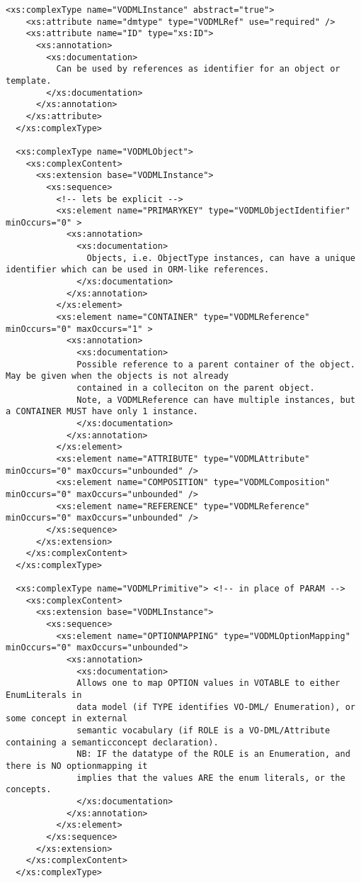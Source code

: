 \documentclass[11pt,a4paper]{ivoa}
\begin{document}
\begin{lstlisting}[label=lst:mapping,caption=VOTable schema extension for VO-DML mapping,frame=tb]
  <xs:complexType name="VODMLInstance" abstract="true">
    <xs:attribute name="dmtype" type="VODMLRef" use="required" />
    <xs:attribute name="ID" type="xs:ID">
      <xs:annotation>
        <xs:documentation>
          Can be used by references as identifier for an object or template.
        </xs:documentation>
      </xs:annotation>
    </xs:attribute>
  </xs:complexType>

  <xs:complexType name="VODMLObject">
    <xs:complexContent>
      <xs:extension base="VODMLInstance">
        <xs:sequence>
          <!-- lets be explicit -->
          <xs:element name="PRIMARYKEY" type="VODMLObjectIdentifier" minOccurs="0" >
            <xs:annotation>
              <xs:documentation>
                Objects, i.e. ObjectType instances, can have a unique identifier which can be used in ORM-like references.
              </xs:documentation>
            </xs:annotation>
          </xs:element>
          <xs:element name="CONTAINER" type="VODMLReference" minOccurs="0" maxOccurs="1" >
            <xs:annotation>
              <xs:documentation>
              Possible reference to a parent container of the object. May be given when the objects is not already
              contained in a colleciton on the parent object.
              Note, a VODMLReference can have multiple instances, but a CONTAINER MUST have only 1 instance.
              </xs:documentation>
            </xs:annotation>
          </xs:element>
          <xs:element name="ATTRIBUTE" type="VODMLAttribute" minOccurs="0" maxOccurs="unbounded" />
          <xs:element name="COMPOSITION" type="VODMLComposition" minOccurs="0" maxOccurs="unbounded" />
          <xs:element name="REFERENCE" type="VODMLReference" minOccurs="0" maxOccurs="unbounded" />
        </xs:sequence>
      </xs:extension>
    </xs:complexContent>
  </xs:complexType>

  <xs:complexType name="VODMLPrimitive"> <!-- in place of PARAM -->
    <xs:complexContent>
      <xs:extension base="VODMLInstance">
        <xs:sequence>
          <xs:element name="OPTIONMAPPING" type="VODMLOptionMapping" minOccurs="0" maxOccurs="unbounded">
            <xs:annotation>
              <xs:documentation>
              Allows one to map OPTION values in VOTABLE to either EnumLiterals in 
              data model (if TYPE identifies VO-DML/ Enumeration), or some concept in external 
              semantic vocabulary (if ROLE is a VO-DML/Attribute containing a semanticconcept declaration).
              NB: IF the datatype of the ROLE is an Enumeration, and there is NO optionmapping it 
              implies that the values ARE the enum literals, or the concepts.
              </xs:documentation>
            </xs:annotation>
          </xs:element>  
        </xs:sequence>
      </xs:extension>
    </xs:complexContent>
  </xs:complexType>



\end{lstlisting}
\end{document}
